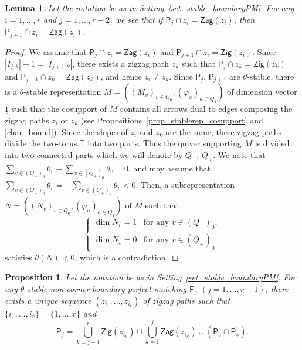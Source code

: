 \documentclass[pdftex]{sigma}
\numberwithin{equation}{section}
\newtheorem{Lemma}[Theorem]{Lemma}
\newtheorem{Proposition}[Theorem]{Proposition}
\theoremstyle{definition}
\newcommand{\TT}{\mathbb{T}}
\newcommand{\sfP}{\mathsf{P}}
\newcommand{\barone}{\underline{1}}
\newcommand{\Zig}{\mathsf{Zig}}
\newcommand{\Zag}{\mathsf{Zag}}
\newcommand{\cPM}{\sfP_\diamond}
\begin{document}
\begin{Lemma}
\label{lem_condition_stable_boundaryPM}
Let the notation be as in Setting~{\rm \ref{set_stable_boundaryPM}}.
For any $i=1, \dots, r$ and $j=1,\dots,r-2$, we see that if $\sfP_j\cap z_i=\Zag(z_i)$, then $\sfP_{j+1}\cap z_i=\Zag(z_i)$.
\end{Lemma}

\begin{proof}
We assume that $\sfP_j\cap z_i=\Zag(z_i)$ and $\sfP_{j+1}\cap z_i=\Zig(z_i)$.
Since $|I_{j,\theta}|+1=|I_{j+1,\theta}|$, there exists a zigzag path $z_k$ such that
$\sfP_j\cap z_k=\Zig(z_k)$ and $\sfP_{j+1}\cap z_k=\Zag(z_k)$, and hence $z_i\neq z_k$.
Since $\sfP_j$, $\sfP_{j+1}$ are $\theta$-stable, there is a $\theta$-stable representation $M=((M_v)_{v\in Q_0}, (\varphi_a)_{a\in Q_1})$
of dimension vector $\barone$
such that the cosupport of $M$ contains all arrows dual to edges composing the zigzag paths $z_i$ or $z_k$ (see Propositions~\ref{prop_stablerep_cosupport} and \ref{char_bound}).
Since the slopes of $z_i$ and $z_k$ are the same, these zigzag paths divide the two-torus $\TT$ into two parts.
Thus the quiver supporting $M$ is divided into two connected parts which we will denote by $Q_-$, $Q_+$.
We note that $\sum_{v\in (Q_-)_0}\theta_v+\sum_{v\in (Q_+)_0}\theta_v=0$, and may assume that
$\sum_{v\in (Q_-)_0}\theta_v=-\sum_{v\in (Q_+)_0}\theta_v<0$.
Then, a subrepresentation $N=((N_v)_{v\in Q_0}, (\varphi_a)_{a\in Q_1})$ of $M$ such that
\[
\begin{cases}
\dim N_v=1& \text{for any $v\in (Q_-)_0$}, \\
\dim N_v=0& \text{for any $v\in (Q_+)_0$}
\end{cases}
\]
satisfies $\theta(N)<0$, which is a contradiction.
\end{proof}

\begin{Proposition}
\label{prop_description_boundaryPM}
Let the notation be as in Setting~{\rm \ref{set_stable_boundaryPM}}.
For any $\theta$-stable non-corner boundary perfect matching $\sfP_j$ $(j=1, \dots, r-1)$,
there exists a unique sequence $(z_{i_1},\dots,z_{i_r})$ of zigzag paths such that
$\{i_1,\dots,i_r\}=\{1,\dots,r\}$ and
\begin{equation*}%
\sfP_j=\bigcup_{k=j+1}^r\Zig(z_{i_k})\cup\bigcup_{k=1}^j\Zag(z_{i_k})\cup (\cPM\cap\cPM^\prime ).
\end{equation*}
\end{Proposition}
\end{document}
